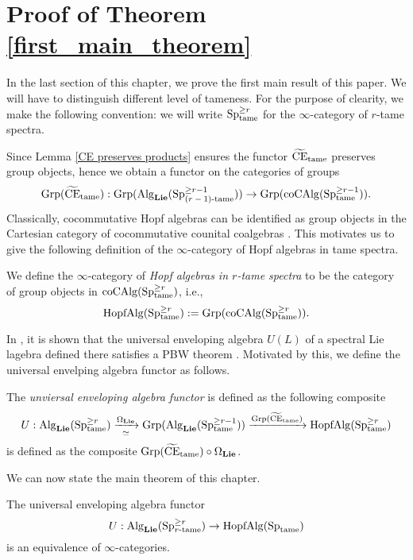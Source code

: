\section{Proof of Theorem \ref{first_main_theorem}}
In the last section of this chapter, we prove the first main result of this paper. 
We will have to distinguish different level of tameness. For the purpose of clearity, we make the following convention: we will write $\operatorname{Sp}^{\geq r}_{\operatorname{\operatorname{tame}}}$ for the $\infty$-category of $r$-tame spectra.

Since Lemma \ref{CE preserves products} ensures the functor $\widetilde{\operatorname{CE}}_{\operatorname{\operatorname{tame}}}$ preserves group objects, hence we obtain a functor on the categories of groups
\[
	\operatorname{Grp}(\widetilde{\operatorname{CE}}_{\operatorname{\operatorname{tame}}}):
	\operatorname{Grp}(\operatorname{Alg}_{\mathbf{Lie}}(\operatorname{Sp}^{\geq r-1}_{\text{($r-1$)-tame}}))
	\to 
	\operatorname{Grp}(\operatorname{coCAlg}(\operatorname{Sp}^{\geq r-1}_{\operatorname{\operatorname{tame}}})).
\]
Classically, cocommutative Hopf algebras can be identified as group objects in the Cartesian category of cocommutative counital coalgebras \cite{Milnor-Moore}. This motivates us to give the following definition of the  $\infty$-category of Hopf algebras in tame spectra. 
\begin{definition}
    We define the $\infty$-category of \emph{Hopf algebras in $r$-tame spectra} to be the category of group objects in $\operatorname{coCAlg}(\operatorname{Sp}^{\geq r}_{\operatorname{\operatorname{tame}}})$, i.e., 
    $$
    \operatorname{HopfAlg}(\operatorname{Sp}^{\geq r}_{\operatorname{\operatorname{tame}}}):= \operatorname{Grp}(\operatorname{coCAlg}(\operatorname{Sp}^{\geq r}_{\operatorname{\operatorname{tame}}})).
    $$
\end{definition}	

In \cite{KnudsenHEA}, it is shown that the universal enveloping algebra $U(L)$ of a spectral Lie lagebra defined there satisfies a PBW theorem
\cite[Theorem B]{KnudsenHEA}.
Motivated by this, we define the universal envelping algebra functor as follows.
\begin{definition}
	The \emph{unviersal enveloping algebra functor} is defined as the following composite
	$$
	U: \operatorname{Alg}_{\mathbf{Lie}}(\operatorname{Sp}^{\geq r}_{\operatorname{\operatorname{tame}}}) 
	\xrightarrow[\simeq]{\Omega_{\mathbf{Lie}}}
	\operatorname{Grp}(\operatorname{Alg}_{\mathbf{Lie}}(\operatorname{Sp}^{\geq r-1}_{\operatorname{\operatorname{tame}}}))
	\xrightarrow{\operatorname{Grp}(\widetilde{\operatorname{CE}}_{\operatorname{\operatorname{tame}}})}
	\operatorname{HopfAlg}(\operatorname{Sp}^{\geq r}_{\operatorname{\operatorname{tame}}})
	$$
	is defined as the composite $\operatorname{Grp}(\widetilde{\operatorname{CE}}_{\operatorname{\operatorname{tame}}}) \circ \Omega_{\mathbf{Lie}}$.
\end{definition}

We can now state the main theorem of this chapter.
\begin{theorem}
\label{first_main_theorem}
	The universal enveloping algebra functor
	$$
	U: \operatorname{Alg}_{\mathbf{Lie}}(\operatorname{Sp}^{\geq r}_{\text{$r$-tame}})  
	\to
	\operatorname{HopfAlg}(\operatorname{Sp}_{\operatorname{\operatorname{tame}}})
	$$
	is an equivalence of $\infty$-categories.
\end{theorem}

